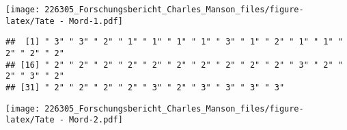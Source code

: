 \documentclass[
]{article}
\newenvironment{Shaded}{\begin{snugshade}}{\end{snugshade}}
\newcommand{\DataTypeTok}[1]{\textcolor[rgb]{0.13,0.29,0.53}{#1}}
\newcommand{\FloatTok}[1]{\textcolor[rgb]{0.00,0.00,0.81}{#1}}
\newcommand{\KeywordTok}[1]{\textcolor[rgb]{0.13,0.29,0.53}{\textbf{#1}}}
\newcommand{\NormalTok}[1]{#1}
\newcommand{\OperatorTok}[1]{\textcolor[rgb]{0.81,0.36,0.00}{\textbf{#1}}}
\newcommand{\StringTok}[1]{\textcolor[rgb]{0.31,0.60,0.02}{#1}}
\begin{document}
\texttt{[image: 226305\_Forschungsbericht\_Charles\_Manson\_files/figure-latex/Tate - Mord-1.pdf]}

\begin{Shaded}
\end{Shaded}

\begin{verbatim}
##  [1] " 3" " 3" " 2" " 1" " 1" " 1" " 1" " 3" " 1" " 2" " 1" " 1" " 2" " 2" " 2"
## [16] " 2" " 2" " 2" " 2" " 2" " 2" " 2" " 2" " 2" " 2" " 3" " 2" " 2" " 3" " 2"
## [31] " 2" " 2" " 2" " 2" " 3" " 2" " 3" " 3" " 3" " 3"
\end{verbatim}

\begin{Shaded}
\end{Shaded}

\texttt{[image: 226305\_Forschungsbericht\_Charles\_Manson\_files/figure-latex/Tate - Mord-2.pdf]}
\end{document}

